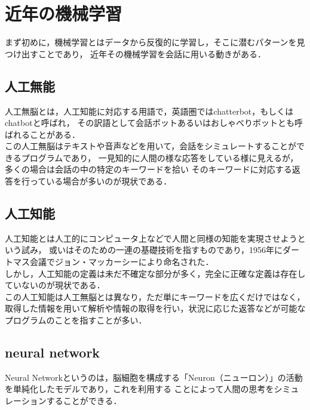 
\section{近年の機械学習}
まず初めに，機械学習とはデータから反復的に学習し，そこに潜むパターンを見つけ出すことであり，
近年その機械学習を会話に用いる動きがある．
\\

\subsection{人工無能}
人工無脳\cite{muno}とは，人工知能に対応する用語で，英語圏ではchatterbot，もしくはchatbotと呼ばれ，
その訳語として会話ボットあるいはおしゃべりボットとも呼ばれることがある．
\\
この人工無脳はテキストや音声などを用いて，会話をシミュレートすることができるプログラムであり，
一見知的に人間の様な応答をしている様に見えるが，多くの場合は会話の中の特定のキーワードを拾い
そのキーワードに対応する返答を行っている場合が多いのが現状である．
\\

\subsection{人工知能}
人工知能\cite{tino}とは人工的にコンピュータ上などで人間と同様の知能を実現させようという試み，
或いはそのための一連の基礎技術を指すものであり，1956年にダートマス会議でジョン・マッカーシーにより命名された．
\\

しかし，人工知能の定義は未だ不確定な部分が多く，完全に正確な定義は存在していないのが現状である．
\\

この人工知能は人工無脳とは異なり，ただ単にキーワードを広くだけではなく，
取得した情報を用いて解析や情報の取得を行い，状況に応じた返答などが可能なプログラムのことを指すことが多い．
\\

\subsection{neural network}
Neural Networkというのは，脳細胞を構成する「Neuron（ニューロン）」の活動を単純化したモデルであり，これを利用する
ことによって人間の思考をシミュレーションすることができる．
\\

